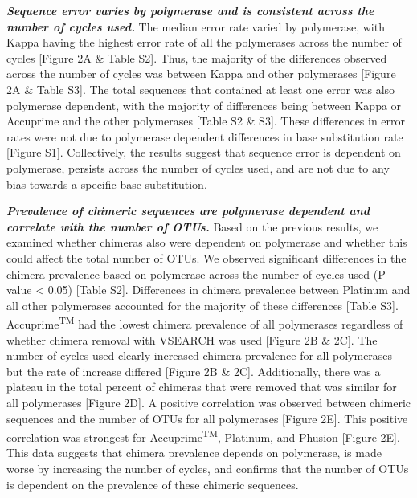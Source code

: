 \documentclass[11pt,]{article}
\begin{document}
\textbf{\emph{Sequence error varies by polymerase and is consistent
across the number of cycles used.}} The median error rate varied by
polymerase, with Kappa having the highest error rate of all the
polymerases across the number of cycles {[}Figure 2A \& Table S2{]}.
Thus, the majority of the differences observed across the number of
cycles was between Kappa and other polymerases {[}Figure 2A \& Table
S3{]}. The total sequences that contained at least one error was also
polymerase dependent, with the majority of differences being between
Kappa or Accuprime and the other polymerases {[}Table S2 \& S3{]}. These
differences in error rates were not due to polymerase dependent
differences in base substitution rate {[}Figure S1{]}. Collectively, the
results suggest that sequence error is dependent on polymerase, persists
across the number of cycles used, and are not due to any bias towards a
specific base substitution.

\textbf{\emph{Prevalence of chimeric sequences are polymerase dependent
and correlate with the number of OTUs.}} Based on the previous results,
we examined whether chimeras also were dependent on polymerase and
whether this could affect the total number of OTUs. We observed
significant differences in the chimera prevalence based on polymerase
across the number of cycles used (P-value \textless{} 0.05) {[}Table
S2{]}. Differences in chimera prevalence between Platinum and all other
polymerases accounted for the majority of these differences {[}Table
S3{]}. Accuprime\textsuperscript{TM} had the lowest chimera prevalence
of all polymerases regardless of whether chimera removal with VSEARCH
was used {[}Figure 2B \& 2C{]}. The number of cycles used clearly
increased chimera prevalence for all polymerases but the rate of
increase differed {[}Figure 2B \& 2C{]}. Additionally, there was a
plateau in the total percent of chimeras that were removed that was
similar for all polymerases {[}Figure 2D{]}. A positive correlation was
observed between chimeric sequences and the number of OTUs for all
polymerases {[}Figure 2E{]}. This positive correlation was strongest for
Accuprime\textsuperscript{TM}, Platinum, and Phusion {[}Figure 2E{]}.
This data suggests that chimera prevalence depends on polymerase, is
made worse by increasing the number of cycles, and confirms that the
number of OTUs is dependent on the prevalence of these chimeric
sequences.
\end{document}

